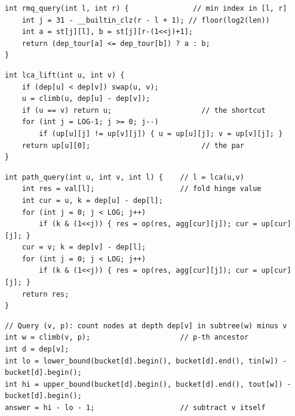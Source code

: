 \begin{lstlisting}[caption={Drill 2 -- sparse-table RMQ query (from lst:c11-sparse)}]
int rmq_query(int l, int r) {               // min index in [l, r]
    int j = 31 - __builtin_clz(r - l + 1); // floor(log2(len))
    int a = st[j][l], b = st[j][r-(1<<j)+1];
    return (dep_tour[a] <= dep_tour[b]) ? a : b;
}
\end{lstlisting}

\begin{lstlisting}[caption={Drill 3 -- lifting LCA (from lst:c11-lcalift)}]
int lca_lift(int u, int v) {
    if (dep[u] < dep[v]) swap(u, v);
    u = climb(u, dep[u] - dep[v]);
    if (u == v) return u;                     // the shortcut
    for (int j = LOG-1; j >= 0; j--)
        if (up[u][j] != up[v][j]) { u = up[u][j]; v = up[v][j]; }
    return up[u][0];                          // the par
}
\end{lstlisting}

\begin{lstlisting}[caption={Drill 4 -- path aggregate (from lst:c11-pathagg)}]
int path_query(int u, int v, int l) {    // l = lca(u,v)
    int res = val[l];                    // fold hinge value
    int cur = u, k = dep[u] - dep[l];
    for (int j = 0; j < LOG; j++)
        if (k & (1<<j)) { res = op(res, agg[cur][j]); cur = up[cur][j]; }
    cur = v; k = dep[v] - dep[l];
    for (int j = 0; j < LOG; j++)
        if (k & (1<<j)) { res = op(res, agg[cur][j]); cur = up[cur][j]; }
    return res;
}
\end{lstlisting}

\begin{lstlisting}[caption={Drill 5 -- depth-bucket query (from lst:c11-208e-soln)}]
// Query (v, p): count nodes at depth dep[v] in subtree(w) minus v
int w = climb(v, p);                     // p-th ancestor
int d = dep[v];
int lo = lower_bound(bucket[d].begin(), bucket[d].end(), tin[w]) - bucket[d].begin();
int hi = upper_bound(bucket[d].begin(), bucket[d].end(), tout[w]) - bucket[d].begin();
answer = hi - lo - 1;                    // subtract v itself
\end{lstlisting}


